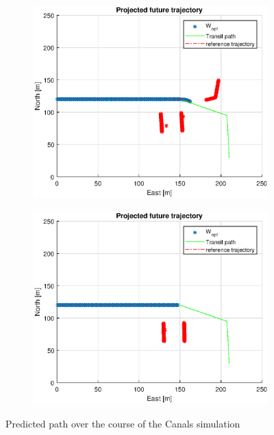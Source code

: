 \begin{figure}
\begin{subfigure}[b]{0.499\textwidth}
    \end{subfigure}
    \hfill
    \\
    \begin{subfigure}[b]{0.49\textwidth}
        \centering
        \includegraphics[width=\textwidth]{Images/Figures/Havn1/Simple0_f999_Frame5}
    \end{subfigure}
    \hfill
    \begin{subfigure}[b]{0.499\textwidth}
        \centering
        \includegraphics[width=\textwidth]{Images/Figures/Havn1/Simple0_f999_Frame6}
    \end{subfigure}
    \hfill
    \caption{Predicted path over the course of the Canals simulation}
\end{figure}


